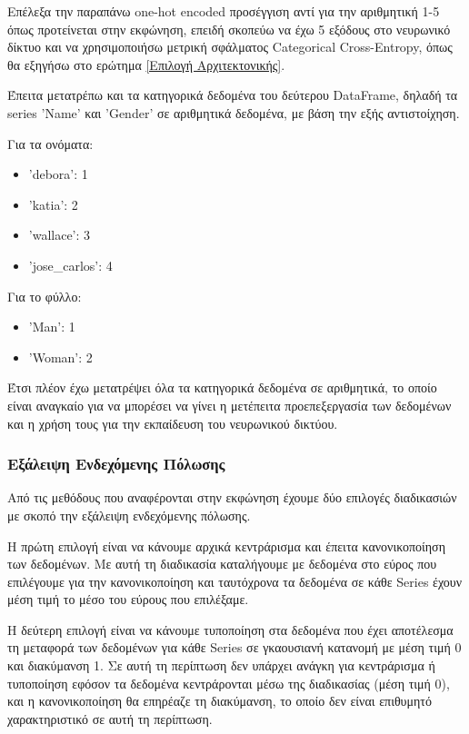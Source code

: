 \documentclass[12pt,a4paper]{article}
\begin{document}
Επέλεξα την παραπάνω one-hot encoded προσέγγιση αντί για την αριθμητική 1-5 όπως προτείνεται στην εκφώνηση, επειδή σκοπεύω να έχω 5 εξόδους στο νευρωνικό δίκτυο και να χρησιμοποιήσω μετρική σφάλματος Categorical Cross-Entropy, όπως θα εξηγήσω στο ερώτημα \ref{Επιλογή Αρχιτεκτονικής}.

Έπειτα μετατρέπω και τα κατηγορικά δεδομένα του δεύτερου DataFrame, δηλαδή τα series 'Name' και 
'Gender' σε αριθμητικά δεδομένα, με βάση την εξής αντιστοίχηση.

Για τα ονόματα:
\begin{itemize}
    \item 'debora': 1
    \item 'katia': 2
    \item 'wallace': 3
    \item 'jose\_carlos': 4
\end{itemize}
Για το φύλλο:
\begin{itemize}
    \item 'Man': 1
    \item 'Woman': 2
\end{itemize}

Έτσι πλέον έχω μετατρέψει όλα τα κατηγορικά δεδομένα σε αριθμητικά, το οποίο είναι αναγκαίο για να μπορέσει να γίνει η μετέπειτα προεπεξεργασία των δεδομένων και η χρήση τους για την εκπαίδευση του νευρωνικού δικτύου.

\subsubsection{Εξάλειψη Ενδεχόμενης Πόλωσης}

Από τις μεθόδους που αναφέρονται στην εκφώνηση έχουμε δύο επιλογές διαδικασιών με σκοπό την εξάλειψη ενδεχόμενης πόλωσης. 

Η πρώτη επιλογή είναι να κάνουμε αρχικά κεντράρισμα και έπειτα κανονικοποίηση των δεδομένων. Με αυτή τη διαδικασία καταλήγουμε με δεδομένα στο εύρος που επιλέγουμε για την κανονικοποίηση και ταυτόχρονα τα δεδομένα σε κάθε Series έχουν μέση τιμή το μέσο του εύρους που επιλέξαμε. 

Η δεύτερη επιλογή είναι να κάνουμε τυποποίηση στα δεδομένα που έχει αποτέλεσμα τη μεταφορά των δεδομένων για κάθε Series σε γκαουσιανή κατανομή με μέση τιμή 0 και διακύμανση 1. Σε αυτή τη περίπτωση δεν υπάρχει ανάγκη για κεντράρισμα ή τυποποίηση εφόσον τα δεδομένα κεντράρονται μέσω της διαδικασίας (μέση τιμή 0), και η κανονικοποίηση θα επηρέαζε τη διακύμανση, το οποίο δεν είναι επιθυμητό χαρακτηριστικό σε αυτή τη περίπτωση. 
\end{document}
